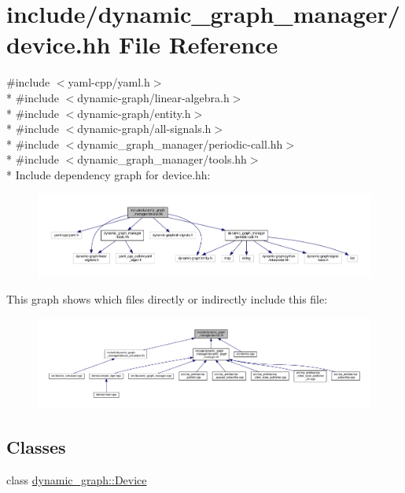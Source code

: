 \hypertarget{device_8hh}{}\section{include/dynamic\+\_\+graph\+\_\+manager/device.hh File Reference}
\label{device_8hh}
{\ttfamily \#include $<$yaml-\/cpp/yaml.\+h$>$}\\*
{\ttfamily \#include $<$dynamic-\/graph/linear-\/algebra.\+h$>$}\\*
{\ttfamily \#include $<$dynamic-\/graph/entity.\+h$>$}\\*
{\ttfamily \#include $<$dynamic-\/graph/all-\/signals.\+h$>$}\\*
{\ttfamily \#include $<$dynamic\+\_\+graph\+\_\+manager/periodic-\/call.\+hh$>$}\\*
{\ttfamily \#include $<$dynamic\+\_\+graph\+\_\+manager/tools.\+hh$>$}\\*
Include dependency graph for device.\+hh\+:
\nopagebreak
\begin{figure}[H]
\begin{center}
\leavevmode
\includegraphics[width=350pt]{device_8hh__incl}
\end{center}
\end{figure}
This graph shows which files directly or indirectly include this file\+:
\nopagebreak
\begin{figure}[H]
\begin{center}
\leavevmode
\includegraphics[width=350pt]{device_8hh__dep__incl}
\end{center}
\end{figure}
\subsection*{Classes}
\begin{DoxyCompactItemize}
\item 
class \hyperlink{classdynamic__graph_1_1Device}{dynamic\+\_\+graph\+::\+Device}
\end{DoxyCompactItemize}
